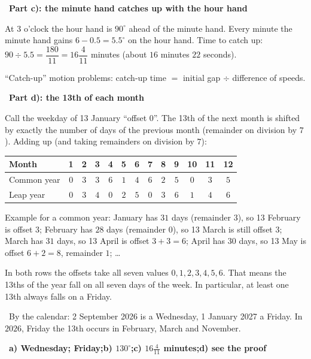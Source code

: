 \documentclass[11pt]{article}
\providecommand{\AnsWord}{Đáp số}
\newcommand{\ans}[1]{\par\smallskip{\bfseries\color{tmGreen!88!black}\AnsWord:}\ {\bfseries\color{AnsRed}#1}\par}
\newcommand{\step}[2]{\par\smallskip\noindent{\bfseries\color{tmBlue!85!black}\StepWord~#1.}\ {\bfseries #2}\par\nopagebreak}
\newcommand{\verify}[1]{\par\smallskip\noindent{\bfseries\color{tmGreen!80!black}\faCheckCircle\ \CheckWord}\ #1\par}
\def\AnsWord{Answer}
\def\StepWord{Step}
\def\CheckWord{Check:}
\begin{document}
{\step{4}{Part c): the minute hand catches up with the hour hand}
At 3 o'clock the hour hand is $90^\circ$ ahead of the minute hand. Every minute the minute hand gains $6 - 0.5 = 5.5^\circ$ on the hour
hand. Time to catch up: $90 \div 5.5 = \dfrac{180}{11} = 16\dfrac{4}{11}$ minutes (about $16$ minutes $22$ seconds).
\begin{recallbox}``Catch-up'' motion problems: catch-up time $=$ initial gap $\div$ difference of speeds.\end{recallbox}
\step{5}{Part d): the 13th of each month}
Call the weekday of 13 January ``offset $0$''. The 13th of the next month is shifted by exactly the number of days of the previous month
(remainder on division by $7$). Adding up (and taking remainders on division by $7$):
\begin{center}\scriptsize
\setlength{\tabcolsep}{3.2pt}
\begin{tabular}{|l|c|c|c|c|c|c|c|c|c|c|c|c|}
\hline
\rowcolor{tmBlue!10} Month & 1 & 2 & 3 & 4 & 5 & 6 & 7 & 8 & 9 & 10 & 11 & 12\\ \hline
Common year & $0$ & $3$ & $3$ & $6$ & $1$ & $4$ & $6$ & $2$ & $5$ & $0$ & $3$ & $5$\\ \hline
Leap year & $0$ & $3$ & $4$ & $0$ & $2$ & $5$ & $0$ & $3$ & $6$ & $1$ & $4$ & $6$\\ \hline
\end{tabular}
\end{center}
Example for a common year: January has $31$ days (remainder $3$), so 13 February is offset $3$; February has $28$ days (remainder $0$),
so 13 March is still offset $3$; March has $31$ days, so 13 April is offset $3 + 3 = 6$; April has $30$ days, so 13 May is offset
$6 + 2 = 8$, remainder $1$; \dots
\begin{proofbox}In both rows the offsets take all seven values $0, 1, 2, 3, 4, 5, 6$. That means the 13ths of the year fall on all seven
days of the week. In particular, at least one 13th always falls on a Friday.\end{proofbox}
\verify{By the calendar: 2 September 2026 is a Wednesday, 1 January 2027 a Friday. In $2026$, Friday the 13th occurs in February, March
and November.}
\ans{a) Wednesday; Friday;\quad b) $130^\circ$;\quad c) $16\frac{4}{11}$ minutes;\quad d) see the proof}
}
\end{document}
